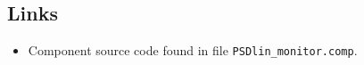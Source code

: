 \subsection*{Links}
\begin{itemize}
  \item Component source code found in file \texttt{PSDlin\_monitor.comp}.
\end{itemize}
